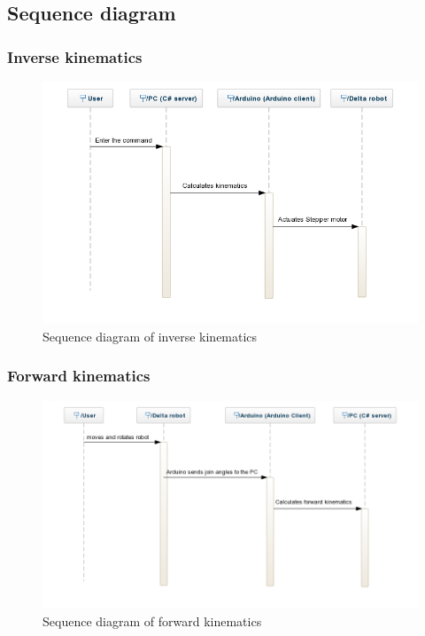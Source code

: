 \subsection{Sequence diagram}
\subsubsection{Inverse kinematics}
\begin{figure}[H]
	\centering
	\includegraphics[width=\maxwidth{15cm}, keepaspectratio]{Chapters/Fig/inverse_kinematics_sequence_diagram.png}
	\caption{Sequence diagram of inverse kinematics}
	\label{fig:inverse_kinematics_sequence_diagram}
\end{figure}

\subsubsection{Forward kinematics}
\begin{figure}[H]
	\centering
	\includegraphics[width=\maxwidth{15cm}, keepaspectratio]{Chapters/Fig/forward_kinematics_sequence_diagram.png}
	\caption{Sequence diagram of forward kinematics}
	\label{fig:forward_kinematics_sequence_diagram}
\end{figure}

